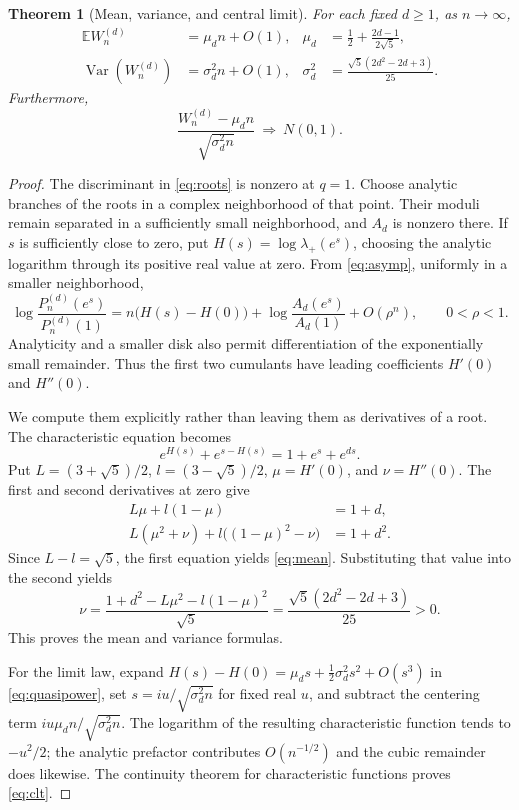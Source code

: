 \documentclass[11pt,letterpaper]{article}
\numberwithin{equation}{section}
\newtheorem{theorem}{Theorem}[section]
\theoremstyle{definition}
\newcommand{\EE}{\mathbb E}
\newcommand{\Var}{\operatorname{Var}}
\begin{document}
\begin{theorem}[Mean, variance, and central limit]\label{thm:clt}
For each fixed $d\geq1$, as $n\to\infty$,
\begin{align}
 \EE W_n^{(d)}&=\mu_dn+O(1),&
 \mu_d&=\frac12+\frac{2d-1}{2\sqrt5},\label{eq:mean}\\
 \Var(W_n^{(d)})&=\sigma_d^2n+O(1),&
 \sigma_d^2&=\frac{\sqrt5(2d^2-2d+3)}{25}.
 \label{eq:variance}
\end{align}
Furthermore,
\begin{equation}\label{eq:clt}
 \frac{W_n^{(d)}-\mu_dn}{\sqrt{\sigma_d^2n}}
 \ \Longrightarrow\ N(0,1).
\end{equation}
\end{theorem}
\begin{proof}
The discriminant in \eqref{eq:roots} is nonzero at $q=1$. Choose analytic
branches of the roots in a complex neighborhood of that point. Their moduli
remain separated in a sufficiently small neighborhood, and $A_d$ is nonzero
there. If $s$ is sufficiently close to zero, put
$H(s)=\log\lambda_+(e^s)$, choosing the analytic logarithm through its positive
real value at zero. From \eqref{eq:asymp}, uniformly in a smaller neighborhood,
\begin{equation}\label{eq:quasipower}
 \log\frac{P_n^{(d)}(e^s)}{P_n^{(d)}(1)}
 =n\bigl(H(s)-H(0)\bigr)
  +\log\frac{A_d(e^s)}{A_d(1)}+O(\rho^n),
 \qquad 0<\rho<1.
\end{equation}
Analyticity and a smaller disk also permit differentiation of the exponentially
small remainder. Thus the first two cumulants have leading coefficients
$H'(0)$ and $H''(0)$.

We compute them explicitly rather than leaving them as derivatives of a root.
The characteristic equation becomes
\[
 e^{H(s)}+e^{s-H(s)}=1+e^s+e^{ds}.
\]
Put $L=(3+\sqrt5)/2$, $l=(3-\sqrt5)/2$, $\mu=H'(0)$, and $\nu=H''(0)$.
The first and second derivatives at zero give
\begin{align*}
 L\mu+l(1-\mu)&=1+d,\\
 L(\mu^2+\nu)+l\bigl((1-\mu)^2-\nu\bigr)&=1+d^2.
\end{align*}
Since $L-l=\sqrt5$, the first equation yields \eqref{eq:mean}. Substituting
that value into the second yields
\[
 \nu=\frac{1+d^2-L\mu^2-l(1-\mu)^2}{\sqrt5}
     =\frac{\sqrt5(2d^2-2d+3)}{25}>0.
\]
This proves the mean and variance formulas.

For the limit law, expand
$H(s)-H(0)=\mu_ds+\tfrac12\sigma_d^2s^2+O(s^3)$ in
\eqref{eq:quasipower}, set $s=iu/\sqrt{\sigma_d^2n}$ for fixed real $u$,
and subtract the centering term $iu\mu_dn/\sqrt{\sigma_d^2n}$. The logarithm
of the resulting characteristic function tends to $-u^2/2$; the analytic
prefactor contributes $O(n^{-1/2})$ and the cubic remainder does likewise.
The continuity theorem for characteristic functions proves
\eqref{eq:clt}.
\end{proof}
\end{document}
